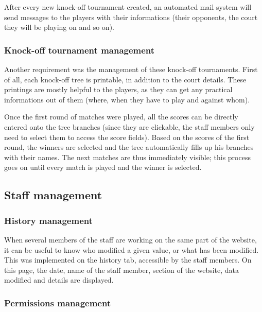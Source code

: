 After every new knock-off tournament created, an automated mail system will send messages to the players with their informations (their opponents, the court they will be playing on and so on).

\subsubsection{Knock-off tournament management}
\label{subs:Knock-off tournament management}


Another requirement was the management of these knock-off tournaments. First of all, each knock-off tree is printable, in addition to the court details. These printings are mostly helpful to the players, as they can get any practical informations out of them (where, when they have to play and against whom). \newline

Once the first round of matches were played, all the scores can be directly entered onto the tree branches (since they are clickable, the staff members only need to select them to access the score fields). Based on the scores of the first round, the winners are selected and the tree automatically fills up his branches with their names. The next matches are thus immediately visible; this process goes on until every match is played and the winner is selected.

\subsection{Staff management}
\label{sub:Staff management}

\subsubsection{History management}
\label{subs:History management}


When several members of the staff are working on the same part of the website, it can be useful to know who modified a given value, or what has been modified. This was implemented on the history tab, accessible by the staff members. On this page, the date, name of the staff member, section of the website, data modified and details are displayed.

\subsubsection{Permissions management}
\label{subs:Permissions management}

